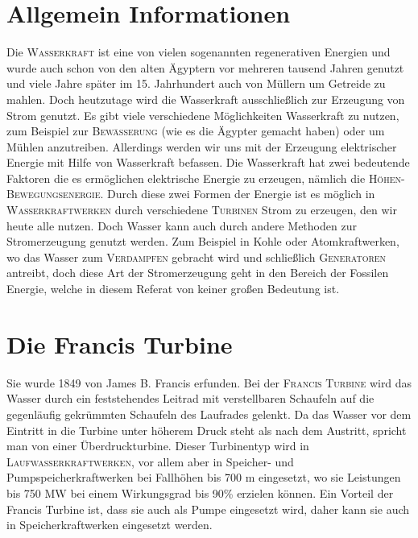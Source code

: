 \documentclass[12pt]{scrbook}
\begin{document}
\newpage

\section{Allgemein Informationen}

Die \textsc{Wasserkraft} ist eine von vielen sogenannten regenerativen Energien und wurde auch 
schon von den alten Ägyptern vor mehreren tausend Jahren genutzt und viele Jahre später 
im 15. Jahrhundert auch von Müllern um Getreide zu mahlen. Doch heutzutage wird die 
Wasserkraft ausschließlich zur Erzeugung von Strom genutzt. Es gibt viele verschiedene 
Möglichkeiten Wasserkraft zu nutzen, zum Beispiel zur \textsc{Bewässerung} (wie es die Ägypter 
gemacht haben) oder um Mühlen anzutreiben. Allerdings werden wir uns mit der Erzeugung 
elektrischer Energie mit Hilfe von Wasserkraft befassen. Die Wasserkraft hat zwei bedeutende 
Faktoren die es ermöglichen elektrische Energie zu erzeugen, nämlich die \textsc{Höhen-Bewegungsenergie}. 
Durch diese zwei Formen der Energie ist es möglich in \textsc{Wasserkraftwerken} durch verschiedene 
\textsc{Turbinen} Strom zu erzeugen, den wir heute alle nutzen. Doch Wasser kann auch durch andere 
Methoden zur Stromerzeugung genutzt werden. Zum Beispiel in Kohle oder Atomkraftwerken, wo 
das Wasser zum \textsc{Verdampfen} gebracht wird und schließlich \textsc{Generatoren} antreibt, doch diese Art 
der Stromerzeugung geht in den Bereich der Fossilen Energie, welche in diesem Referat von keiner großen Bedeutung ist.

\newpage

\section{Die Francis Turbine}

Sie wurde 1849 von James B. Francis erfunden. Bei der \textsc{Francis Turbine} wird das
Wasser durch ein feststehendes Leitrad mit verstellbaren Schaufeln auf die
gegenläufig gekrümmten Schaufeln des Laufrades gelenkt. Da das Wasser vor dem
Eintritt in die Turbine unter höherem Druck steht als nach dem Austritt,
spricht man von einer Überdruckturbine. Dieser Turbinentyp wird in 
\textsc{Laufwasserkraftwerken}, vor allem aber in Speicher- und 
Pumpspeicherkraftwerken
bei Fallhöhen bis 700 m eingesetzt, wo sie Leistungen bis 750 MW bei einem
Wirkungsgrad bis 90\% erzielen können. Ein Vorteil der Francis Turbine ist,
dass sie auch als Pumpe eingesetzt wird, daher kann sie auch in
Speicherkraftwerken eingesetzt werden.
\end{document}
